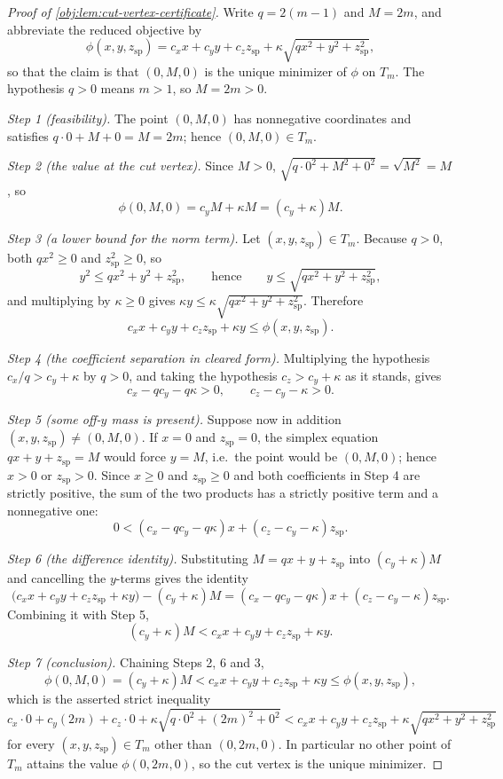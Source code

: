 \begin{proof}[Proof of \cref{obj:lem:cut-vertex-certificate}]
Write \(q=2(m-1)\) and \(M=2m\), and abbreviate the reduced objective by
\[
\phi(x,y,z_{\mathrm{sp}})
=c_xx+c_yy+c_zz_{\mathrm{sp}}
+\kappa\sqrt{qx^2+y^2+z_{\mathrm{sp}}^2},
\]
so that the claim is that \((0,M,0)\) is the unique minimizer of \(\phi\) on \(T_m\).  The hypothesis \(q>0\) means \(m>1\), so \(M=2m>0\).

\emph{Step 1 (feasibility).}  The point \((0,M,0)\) has nonnegative coordinates and satisfies \(q\cdot0+M+0=M=2m\); hence \((0,M,0)\in T_m\). %

\emph{Step 2 (the value at the cut vertex).}  Since \(M>0\), \(\sqrt{q\cdot0^2+M^2+0^2}=\sqrt{M^2}=M\), so
\[
\phi(0,M,0)=c_yM+\kappa M=(c_y+\kappa)M .
\]

\emph{Step 3 (a lower bound for the norm term).}  Let \((x,y,z_{\mathrm{sp}})\in T_m\).  Because \(q>0\), both \(qx^2\ge0\) and \(z_{\mathrm{sp}}^2\ge0\), so
\[
y^2\le qx^2+y^2+z_{\mathrm{sp}}^2,
\qquad\text{hence}\qquad
y\le\sqrt{qx^2+y^2+z_{\mathrm{sp}}^2},
\]
and multiplying by \(\kappa\ge0\) gives \(\kappa y\le\kappa\sqrt{qx^2+y^2+z_{\mathrm{sp}}^2}\).  Therefore
\[
c_xx+c_yy+c_zz_{\mathrm{sp}}+\kappa y\le\phi(x,y,z_{\mathrm{sp}}).
\]

\emph{Step 4 (the coefficient separation in cleared form).}  Multiplying the hypothesis \(c_x/q>c_y+\kappa\) by \(q>0\), and taking the hypothesis \(c_z>c_y+\kappa\) as it stands, gives
\[
c_x-qc_y-q\kappa>0,
\qquad
c_z-c_y-\kappa>0 .
\]

\emph{Step 5 (some off-\(y\) mass is present).}  Suppose now in addition \((x,y,z_{\mathrm{sp}})\ne(0,M,0)\).  If \(x=0\) and \(z_{\mathrm{sp}}=0\), the simplex equation \(qx+y+z_{\mathrm{sp}}=M\) would force \(y=M\), i.e.\ the point would be \((0,M,0)\); hence \(x>0\) or \(z_{\mathrm{sp}}>0\).  Since \(x\ge0\) and \(z_{\mathrm{sp}}\ge0\) and both coefficients in Step 4 are strictly positive, the sum of the two products has a strictly positive term and a nonnegative one:
\[
0<(c_x-qc_y-q\kappa)x+(c_z-c_y-\kappa)z_{\mathrm{sp}} .
\]

\emph{Step 6 (the difference identity).}  Substituting \(M=qx+y+z_{\mathrm{sp}}\) into \((c_y+\kappa)M\) and cancelling the \(y\)-terms gives the identity
\[
\bigl(c_xx+c_yy+c_zz_{\mathrm{sp}}+\kappa y\bigr)-(c_y+\kappa)M
=(c_x-qc_y-q\kappa)x+(c_z-c_y-\kappa)z_{\mathrm{sp}} .
\]
Combining it with Step 5,
\[
(c_y+\kappa)M<c_xx+c_yy+c_zz_{\mathrm{sp}}+\kappa y .
\]

\emph{Step 7 (conclusion).}  Chaining Steps 2, 6 and 3,
\[
\phi(0,M,0)=(c_y+\kappa)M
<c_xx+c_yy+c_zz_{\mathrm{sp}}+\kappa y
\le\phi(x,y,z_{\mathrm{sp}}),
\]
which is the asserted strict inequality
\[
c_x\cdot0+c_y(2m)+c_z\cdot0+\kappa\sqrt{q\cdot0^2+(2m)^2+0^2}
<c_xx+c_yy+c_zz_{\mathrm{sp}}+\kappa\sqrt{qx^2+y^2+z_{\mathrm{sp}}^2}
\]
for every \((x,y,z_{\mathrm{sp}})\in T_m\) other than \((0,2m,0)\).  In particular no other point of \(T_m\) attains the value \(\phi(0,2m,0)\), so the cut vertex is the unique minimizer. %
\end{proof}
